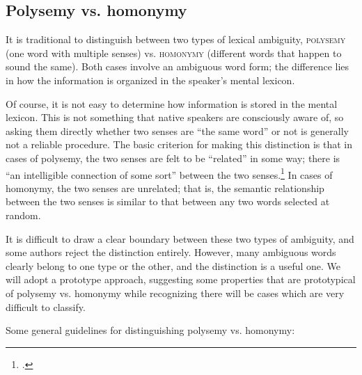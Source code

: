 \subsection{Polysemy vs. homonymy}\label{sec:} %

It is traditional to distinguish between two types of lexical ambiguity, \textsc{polysemy} (one word with multiple senses) vs. \textsc{homonymy} (different words that happen to sound the same). Both cases involve an ambiguous word form; the difference lies in how the information is organized in the speaker’s mental lexicon.


Of course, it is not easy to determine how information is stored in the mental lexicon. This is not something that native speakers are consciously aware of, so asking them directly whether two senses are “the same word” or not is generally not a reliable procedure. The basic criterion for making this distinction is that in cases of polysemy, the two senses are felt to be “related” in some way; there is “an intelligible connection of some sort” between the two senses.\footnote{\citet[109]{Cruse2000}.} In cases of homonymy, the two senses are unrelated; that is, the semantic relationship between the two senses is similar to that between any two words selected at random.



It is difficult to draw a clear boundary between these two types of ambiguity, and some authors reject the distinction entirely. However, many ambiguous words clearly belong to one type or the other, and the distinction is a useful one. We will adopt a prototype approach, suggesting some properties that are prototypical of polysemy vs. homonymy while recognizing there will be cases which are very difficult to classify.


Some general guidelines for distinguishing polysemy vs. homonymy:

